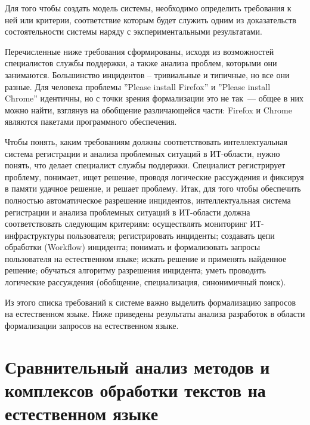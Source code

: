 Для того чтобы создать модель системы, необходимо определить требования к ней или критерии, соответствие которым будет служить одним из доказательств состоятельности системы наряду с экспериментальными результатами. \par

Перечисленные ниже требования сформированы, исходя из возможностей специалистов службы поддержки, а также анализа проблем, которыми они занимаются. Большинство инцидентов – тривиальные и типичные, но все они разные. Для человека проблемы ”Please install Firefox” и ”Please install Chrome” идентичны, но с точки зрения формализации это не так~--- общее в них можно найти, взглянув на обобщение различающейся части: Firefox и Chrome являются пакетами программного обеспечения. \par 
Чтобы понять, каким требованиям должны соответствовать интеллектуальная система регистрации и анализа проблемных ситуаций в ИТ-области, нужно понять, что делает специалист службы поддержки. Специалист регистрирует проблему, понимает, ищет решение, проводя логические рассуждения и фиксируя в памяти удачное решение, и решает проблему. Итак, для того чтобы обеспечить полностью автоматическое разрешение инцидентов, интеллектуальная система регистрации и анализа проблемных ситуаций в ИТ-области должна соответствовать следующим критериям: осуществлять мониторинг ИТ-инфраструктуры пользователя; регистрировать инциденты; создавать цепи обработки (Workflow) инцидента; понимать и формализовать запросы пользователя на естественном языке; искать решение и применять найденное решение; обучаться алгоритму разрешения инцидента; уметь проводить логические рассуждения (обобщение, специализация, синонимичный поиск). \par
Из этого списка требований к системе важно выделить формализацию запросов на естественном языке. Ниже приведены результаты анализа разработок в области формализации запросов на естественном языке. 

\clearpage

\section{Сравнительный анализ методов и комплексов обработки текстов на естественном языке}


